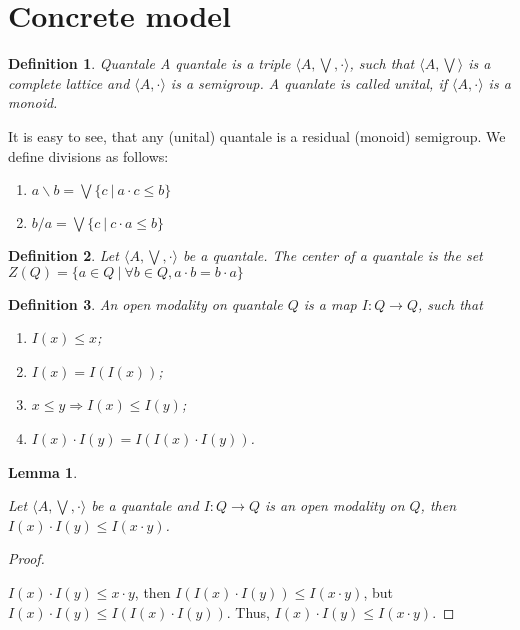 \documentclass[a4paper]{article}
\newtheorem{lemma}{Lemma}
\newtheorem{defin}{Definition}
\begin{document}
\section{Concrete model}

\begin{defin} Quantale
  A quantale is a triple $\langle A, \bigvee, \cdot \rangle$, such that $\langle A, \bigvee \rangle$
is a complete lattice and $\langle A, \cdot \rangle$ is a semigroup. A quanlate is called unital, if $\langle A, \cdot \rangle$
is a monoid.
\end{defin}

It is easy to see, that any (unital) quantale is a residual (monoid) semigroup. We define divisions as follows:

\begin{enumerate}
\item $a \backslash b = \bigvee \{ c \: | \: a \cdot c \leq b \}$
\item $b / a = \bigvee \{ c \: | \: c \cdot a \leq b \}$
\end{enumerate}

\begin{defin}
  Let $\langle A, \bigvee, \cdot \rangle$ be a quantale. The center of a quantale is the set $Z(Q) = \{ a \in Q \: | \: \forall b \in Q, a \cdot b = b \cdot a \}$
\end{defin}

\begin{defin} An open modality on quantale $Q$ is a map $I : Q \to Q$, such that

\begin{enumerate}
  \item $I(x) \leq x$;
  \item $I(x) = I(I(x))$;
  \item $x \leq y \Rightarrow I(x) \leq I(y)$;
  \item $I(x) \cdot I(y) = I(I(x) \cdot I(y))$.
\end{enumerate}
\end{defin}

\begin{lemma}
$ $

  Let $\langle A, \bigvee, \cdot \rangle$ be a quantale and $I : Q \to Q$ is an open modality on $Q$, then
  $I(x) \cdot I(y) \leq I(x \cdot y)$.
\end{lemma}

\begin{proof}
$ $

  $I(x) \cdot I(y) \leq x \cdot y$, then $I(I(x) \cdot I(y)) \leq I(x \cdot y)$, but
$I(x) \cdot I(y) \leq I(I(x) \cdot I(y))$. Thus, $I(x) \cdot I(y) \leq I(x \cdot y)$.
\end{proof}
\end{document}
